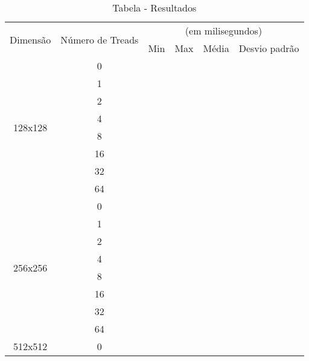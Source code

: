 \newpage
\begin{table}[!h]
	\centering
	\caption{Tabela - Resultados}
	\label{Tabela Resultados}
	\begin{tabular}{|c|c|cccc|}
		\hline
		\multirow{2}{*}{Dimensão} & \multirow{2}{*}{Número de Treads} & \multicolumn{4}{c}{(em milisegundos)} \\
		&                                   & Min  & Max  & Média  & Desvio padrão  \\ \hline\hline
		\multirow{8}{*}{128x128}      & 0                                &      &      &       &             \\
		& 1                                 &      &      &        &                \\
		& 2                                 &      &      &        &                \\
		& 4                                 &      &      &        &                \\
		& 8                                 &      &      &        &                \\
		& 16                                &      &      &        &                \\
		& 32                                &      &      &        &                \\
		& 64                                &      &      &        &               \\ \hline
		\multirow{8}{*}{256x256}      & 0                                &      &      &        &                \\
		& 1                                 &      &      &        &                \\
		& 2                                 &      &      &        &                \\
		& 4                                 &      &      &        &                \\
		& 8                                 &      &      &        &                \\
		& 16                                &      &      &        &                \\
		& 32                                &      &      &        &                \\
		& 64                                &      &      &        &               \\ \hline
		\multirow{8}{*}{512x512}      & 0                                &      &      &        &                \\

\end{tabular}
\end{table}
